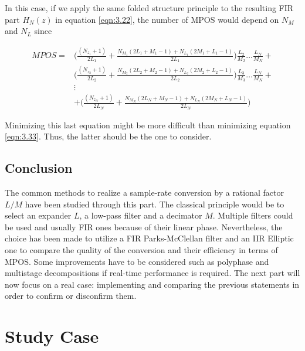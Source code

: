 \begin{itemize}
\begin{itemize}
	In this case, if we apply the same folded structure principle  to the resulting FIR part $H_N(z)$ in equation \ref{eqn:3.22}, the number of MPOS would depend on $N_M$ and $N_L$ since
	
	 
\end{itemize}


\end{itemize}

\newpage

\begin{small}

\begin{align}
MPOS = &\Bigg (\frac{ (N_{z_1} +1) }{2L_1}+ \frac{N_{M_1}(2L_1+M_1-1)+N_{L_1}(2M_1+L_1-1)}{2L_1}  \Bigg ) \frac{L_2}{M_2}\dots\frac{L_N}{M_N} + \nonumber\\ 
&\Bigg (\frac{ (N_{z_2} +1)}{2L_2} + \frac{N_{M_2}(2L_2+M_2-1)+N_{L_2}(2M_2+L_2-1)}{2L_2} \Bigg ) \frac{L_3}{M_3}\dots \frac{L_N}{M_N} +\nonumber\\
&\vdots \nonumber\\ 
&+\Bigg (\frac{ (N_{z_N} +1)}{2L_N} + \frac{N_{M_N}(2L_N+M_N-1)+N_{L_N}(2M_N+L_N-1)}{2L_N} \Bigg) 
\end{align}

\end{small}
Minimizing this last equation might be more difficult than minimizing equation \ref{eqn:3.33}. Thus, the latter should be the one to consider. 

\subsection{Conclusion}


The common methods to realize a sample-rate conversion by a rational factor $L/M$ have been studied through this part. The classical principle would be to select an expander $L$, a low-pass filter and a decimator $M$. Multiple filters could be used and usually FIR ones because of their linear phase. Nevertheless, the choice has been made to utilize a FIR Parks-McClellan filter and an IIR Elliptic one to compare the  quality of the conversion and their efficiency in terms of MPOS. Some improvements have to be considered such as polyphase and multistage decompositions if real-time performance is required. The next part will now focus on a real case: implementing and comparing the previous statements  in order to confirm or disconfirm them. 


\section{Study Case}

